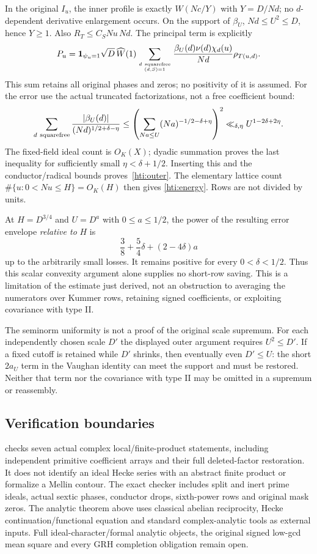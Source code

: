 \documentclass[11pt,oneside,openany]{book}
\theoremstyle{definition}\newtheorem{definition}[theorem]{Definition}
\theoremstyle{remark}\newtheorem{remark}[theorem]{Remark}
\begin{document}
In the original $I_u$, the inner profile is exactly $W(Nc/Y)$ with
$Y=D/Nd$; no $d$-dependent derivative enlargement occurs. On the support
of $\beta_U$, $Nd\le U^2\le D$, hence $Y\ge1$. Also
$R_T\le C_S Nu\,Nd$. The principal term is explicitly
\[
 P_u=\mathbf1_{\psi_u=1}\sqrt D\,\widehat W(1)
 \sum_{d\ {\rm squarefree}\atop(d,S)=1}
       \frac{\beta_U(d)\nu(d)\chi_d(u)}{Nd}\rho_{T(u,d)}.
\]
This sum retains all original phases and zeros; no positivity of it is
assumed. For the error use the actual truncated factorizations, not a free
coefficient bound:
\[
 \sum_{d\ {\rm squarefree}}\frac{|\beta_U(d)|}{(Nd)^{1/2+\delta-\eta}}
 \le\left(\sum_{Na\le U}(Na)^{-1/2-\delta+\eta}\right)^2
 \ll_{\delta,\eta}U^{1-2\delta+2\eta}.
\]
The fixed-field ideal count is $O_K(X)$; dyadic summation proves the last
inequality for sufficiently small $\eta<\delta+1/2$. Inserting this and
the conductor/radical bounds proves~\eqref{hti:outer}.
The elementary lattice count $\#\{u:0<Nu\le H\}=O_K(H)$ then gives
\eqref{hti:energy}. Rows are not divided by units.

At $H=D^{3/4}$ and $U=D^a$ with $0\le a\le1/2$, the power of the
resulting error envelope \emph{relative to} $H$ is
\[
 \frac38+\frac54\delta+(2-4\delta)a
\]
up to the arbitrarily small losses. It remains positive for every
$0<\delta<1/2$. Thus this scalar convexity argument alone supplies no
short-row saving. This is a limitation of the estimate just derived,
not an obstruction to averaging the numerators over Kummer rows, retaining
signed coefficients, or exploiting covariance with type II.

The seminorm uniformity is not a proof of the original scale supremum.
For each independently chosen scale $D'$ the displayed outer argument
requires $U^2\le D'$. If a fixed cutoff is retained while $D'$ shrinks,
then eventually even $D'\le U$: the short $2a_U$ term in the Vaughan
identity can meet the support and must be restored. Neither that term nor
the covariance with type II may be omitted in a supremum or reassembly.

\subsection{Verification boundaries}
 checks seven actual complex local/finite-product
statements, including independent primitive coefficient arrays and their
full deleted-factor restoration. It does not identify an ideal Hecke
series with an abstract finite product or formalize a Mellin contour.
The exact checker includes split and inert prime ideals, actual sextic
phases, conductor drops, sixth-power rows and original mask zeros.
The analytic theorem above uses classical abelian reciprocity, Hecke
continuation/functional equation and standard complex-analytic tools as
external inputs. Full ideal-character/formal analytic objects, the original
signed low-gcd mean square and every GRH completion obligation remain open.
\end{document}
